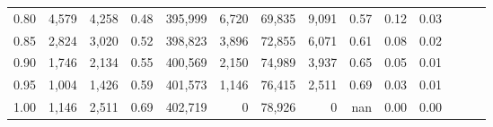 \begin{tabular}{rrrrrrrrrrrrrr}
0.80 &   4,579 &  4,258 &  0.48 &  395,999 &    6,720 &  69,835 &   9,091 &  0.57 &  0.12 &      0.03 \\
0.85 &   2,824 &  3,020 &  0.52 &  398,823 &    3,896 &  72,855 &   6,071 &  0.61 &  0.08 &      0.02 \\
0.90 &   1,746 &  2,134 &  0.55 &  400,569 &    2,150 &  74,989 &   3,937 &  0.65 &  0.05 &      0.01 \\
0.95 &   1,004 &  1,426 &  0.59 &  401,573 &    1,146 &  76,415 &   2,511 &  0.69 &  0.03 &      0.01 \\
1.00 &   1,146 &  2,511 &  0.69 &  402,719 &        0 &  78,926 &       0 &   nan &  0.00 &      0.00 \\
\bottomrule
\end{tabular}

